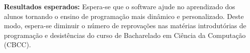 \documentclass[12pt,english,brazil,a4paper,utf8,oneside]{utfpr-tcc}
\begin{document}
\begin{resumo}
\textbf{Resultados esperados:} Espera-se que o software ajude no aprendizado dos alunos tornando o ensino de programação mais dinâmico e personalizado. Deste modo, espera-se diminuir o número de reprovações nas matérias introdutórias de programação e desistências do curso de Bacharelado em Ciência da Computação (CBCC).


\end{resumo}







\listoffigures
\listoftables

\tableofcontents

\mainmatter






\backmatter
\end{document}
